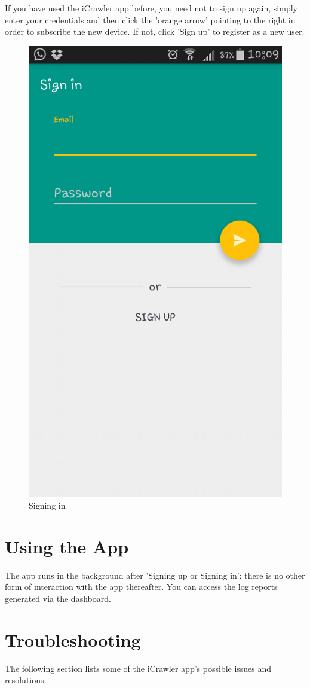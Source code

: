 \documentclass[hidelinks, 12pt, oneside]{article}
\begin{document}
\begin{itemize}
	 	If you have used the iCrawler app before, you need not to sign up again, simply enter your credentials and then
	 	click the 'orange arrow' pointing to the right in order to subscribe the new device. If not, click 'Sign up' to register as a new user.
	 	
	 	 \begin{figure}[h!]
	 	 	\caption{Signing in}
	 	 	\centering 																																		\includegraphics[width=0.5 \textwidth]{img/newImgs/signIn.png}
	 	 \end{figure}
	 	 
	 \end{itemize}\newpage
	 
	 
	\section{Using the App}
	The app runs in the background after 'Signing up or Signing in'; there is no other form of interaction with 
	the app thereafter. You can access the log reports generated via the dashboard.
	\newline\newline
	
	\section{Troubleshooting}
	The following section lists some of the iCrawler app's possible issues and resolutions:
	
\end{document}
